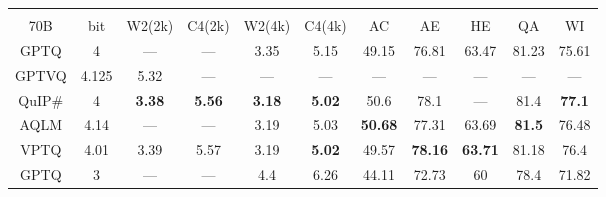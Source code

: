 \begin{table}[hbt!]
{\begin{tabular}{c|c|cccc|ccccc}
                     &                      &                         &                         &                         &                         &                     &                     &                     &                     &                     \\
\multirow{2}{*}{70B} & \multirow{2}{*}{bit} & \multirow{2}{*}{W2(2k)} & \multirow{2}{*}{C4(2k)} & \multirow{2}{*}{W2(4k)} & \multirow{2}{*}{C4(4k)} & \multirow{2}{*}{AC} & \multirow{2}{*}{AE} & \multirow{2}{*}{HE} & \multirow{2}{*}{QA} & \multirow{2}{*}{WI} \\
                     &                      &                         &                         &                         &                         &                     &                     &                     &                     &                     \\ \hline
GPTQ                 & 4                    & ---                     & ---                     & 3.35                    & 5.15                    & 49.15               & 76.81               & 63.47               & 81.23               & 75.61               \\
GPTVQ                & 4.125                & 5.32                    & ---                     & ---                     & ---                     & ---                 & ---                 & ---                 & ---                 & ---                 \\
QuIP\#               & 4                    & \textbf{3.38}           & \textbf{5.56}           & \textbf{3.18}           & \textbf{5.02}           & 50.6                & 78.1                & ---                   & 81.4                & \textbf{77.1}       \\
AQLM                 & 4.14                 & ---                     & ---                     & 3.19                    & 5.03                    & \textbf{50.68}      & 77.31               & 63.69               & \textbf{81.5}       & 76.48               \\
VPTQ                 & 4.01                 & 3.39                    & 5.57                    & 3.19                    & \textbf{5.02}           & 49.57               & \textbf{78.16}      & \textbf{63.71}      & 81.18               & 76.4                \\ \hline
GPTQ                 & 3                    & ---                     & ---                     & 4.4                     & 6.26                    & 44.11               & 72.73               & 60                  & 78.4                & 71.82               \\

\end{tabular}}
\end{table}

